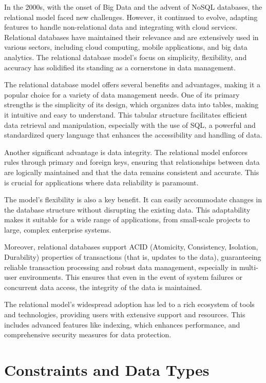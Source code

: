 In the 2000s, with the onset of Big Data and the advent of NoSQL databases, the relational model faced new challenges. However, it continued to evolve, adapting features to handle non-relational data and integrating with cloud services. Relational databases have maintained their relevance and are extensively used in various sectors, including cloud computing, mobile applications, and big data analytics. The relational database model's focus on simplicity, flexibility, and accuracy has solidified its standing as a cornerstone in data management.

The relational database model offers several benefits and advantages, making it a popular choice for a variety of data management needs. One of its primary strengths is the simplicity of its design, which organizes data into tables, making it intuitive and easy to understand. This tabular structure facilitates efficient data retrieval and manipulation, especially with the use of SQL, a powerful and standardized query language that enhances the accessibility and handling of data.

Another significant advantage is data integrity. The relational model enforces rules through primary and foreign keys, ensuring that relationships between data are logically maintained and that the data remains consistent and accurate. This is crucial for applications where data reliability is paramount.

The model's flexibility is also a key benefit. It can easily accommodate changes in the database structure without disrupting the existing data. This adaptability makes it suitable for a wide range of applications, from small-scale projects to large, complex enterprise systems.

Moreover, relational databases support ACID (Atomicity, Consistency, Isolation, Durability) properties of transactions (that is, updates to the data), guaranteeing reliable transaction processing and robust data management, especially in multi-user environments. This ensures that even in the event of system failures or concurrent data access, the integrity of the data is maintained.

The relational model's widespread adoption has led to a rich ecosystem of tools and technologies, providing users with extensive support and resources. This includes advanced features like indexing, which enhances performance, and comprehensive security measures for data protection.

\section{Constraints and Data Types}

